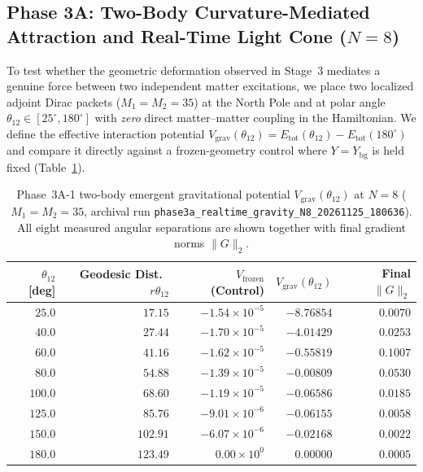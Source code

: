 \documentclass[11pt,a4paper]{article}
\begin{document}
\subsection{Phase 3A: Two-Body Curvature-Mediated Attraction and Real-Time Light Cone ($N = 8$)}
\label{sec:exp_3a}

To test whether the geometric deformation observed in Stage~3 mediates a genuine force between two independent matter excitations, we place two localized adjoint Dirac packets ($M_1 = M_2 = 35$) at the North Pole and at polar angle $\theta_{12} \in [25^\circ, 180^\circ]$ with \emph{zero} direct matter--matter coupling in the Hamiltonian. We define the effective interaction potential $V_{\mathrm{grav}}(\theta_{12}) = E_{\mathrm{tot}}(\theta_{12}) - E_{\mathrm{tot}}(180^\circ)$ and compare it directly against a frozen-geometry control where $Y = Y_{\mathrm{bg}}$ is held fixed (Table~\ref{tab:phase3a}).

\begin{table}[H]
  \centering
  \caption{Phase~3A-1 two-body emergent gravitational potential $V_{\mathrm{grav}}(\theta_{12})$ at $N=8$ ($M_1=M_2=35$, archival run \texttt{phase3a\_realtime\_gravity\_N8\_20261125\_180636}). All eight measured angular separations are shown together with final gradient norms $\|G\|_2$.}
  \label{tab:phase3a}
  \small
  \setlength{\tabcolsep}{6pt}
  \begin{tabular}{@{}rrrrr@{}}
    \toprule
    $\theta_{12}$ [deg] & Geodesic Dist.\ $r\theta_{12}$ & $V_{\mathrm{frozen}}$ (Control) & $V_{\mathrm{grav}}(\theta_{12})$ & Final $\|G\|_2$ \\
    \midrule
    $25.0$  & $17.15$  & $-1.54\times 10^{-5}$ & $-8.76854$ & $0.0070$ \\
    $40.0$  & $27.44$  & $-1.70\times 10^{-5}$ & $-4.01429$ & $0.0253$ \\
    $60.0$  & $41.16$  & $-1.62\times 10^{-5}$ & $-0.55819$ & $0.1007$ \\
    $80.0$  & $54.88$  & $-1.39\times 10^{-5}$ & $-0.00809$ & $0.0530$ \\
    $100.0$ & $68.60$  & $-1.19\times 10^{-5}$ & $-0.06586$ & $0.0185$ \\
    $125.0$ & $85.76$  & $-9.01\times 10^{-6}$ & $-0.06155$ & $0.0058$ \\
    $150.0$ & $102.91$ & $-6.07\times 10^{-6}$ & $-0.02168$ & $0.0022$ \\
    $180.0$ & $123.49$ & $0.00\times 10^{0}$   & $0.00000$  & $0.0005$ \\
    \bottomrule
  \end{tabular}
\end{table}
\end{document}
